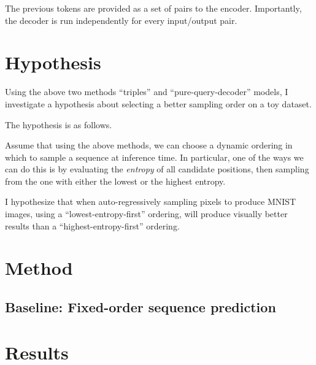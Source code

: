 The previous tokens are provided as a set of pairs to the encoder. Importantly, the decoder is run independently for every input/output pair.


\section{Hypothesis}
\label{s:a-o-hypotheses}

Using the above two methods ``triples'' and ``pure-query-decoder'' models, I investigate a hypothesis about selecting a better sampling order on a toy dataset.

The hypothesis is as follows.

Assume that using the above methods, we can choose a dynamic ordering in which to sample a sequence at inference time. In particular, one of the ways we can do this is by evaluating the \textit{entropy} of all candidate positions, then sampling from the one with either the lowest or the highest entropy.

I hypothesize that when auto-regressively sampling pixels to produce MNIST images, using a ``lowest-entropy-first'' ordering, will produce visually better results than a ``highest-entropy-first'' ordering.

\section{Method}

\subsection{}

\subsection{Baseline: Fixed-order sequence prediction}



\section{Results}
